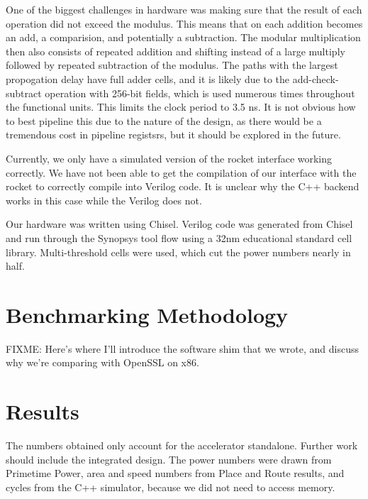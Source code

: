 \documentclass[twocolumn]{article}
\begin{document}
One of the biggest challenges in hardware was making sure that the result of each 
operation did not exceed the modulus. This means that on each addition becomes an 
add, a comparision, and potentially a subtraction. The modular multiplication then 
also consists of repeated addition and shifting instead of a large multiply followed
by repeated subtraction of the modulus. The paths with the largest propogation delay
have full adder cells, and it is likely due to the add-check-subtract operation with 
256-bit fields, which is used numerous times throughout the functional units. This 
limits the clock period to 3.5 ns. It is not obvious how to best pipeline this due 
to the nature of the design, as there would be a tremendous cost in pipeline registsrs, 
but it should be explored in the future. 

Currently, we only have a simulated version of the rocket interface working correctly. 
We have not been able to get the compilation of our interface with the rocket to correctly
compile into Verilog code. It is unclear why the C++ backend works in this case while the Verilog
does not. 

Our hardware was written using Chisel. Verilog code was generated from Chisel and run through
the Synopsys tool flow using a 32nm educational standard cell library. Multi-threshold cells were
used, which cut the power numbers nearly in half. 

\section{Benchmarking Methodology}

FIXME: Here's where I'll introduce the software shim that we wrote,
and discuss why we're comparing with OpenSSL on x86.

\section{Results}

The numbers obtained only account for the accelerator standalone. Further work should
include the integrated design. The power numbers were drawn from Primetime Power, area 
and speed numbers from Place and Route results, and cycles from the C++ simulator, because
we did not need to access memory. 
\end{document}
